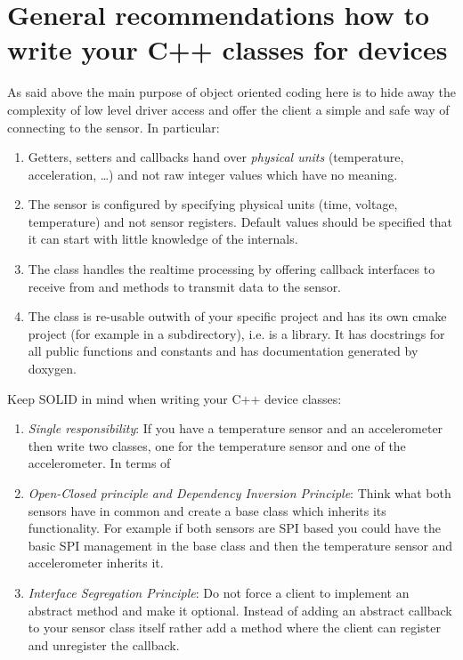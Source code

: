 \documentclass[12pt]{report}
\begin{document}
\section{General recommendations how to write your C++ classes for devices}
As said above the main purpose of object oriented coding here is to
hide away the complexity of low level driver access and offer the
client a simple and safe way of connecting to the sensor. In particular:
\begin{enumerate}
\item Getters, setters and callbacks hand over \textsl{physical units}
  (temperature, acceleration, \ldots) and not
  raw integer values which have no meaning.
\item The sensor is configured by specifying physical units (time, voltage,
  temperature) and not sensor registers. Default values should be
  specified that it can start with little knowledge of the internals.
\item The class handles the realtime processing by offering callback
  interfaces to receive from and methods to transmit data to the sensor.
\item The class is re-usable outwith of your specific project and has
  its own cmake project (for example in a subdirectory), i.e. is a
  library. It has docstrings for all public functions and constants
  and has documentation generated by doxygen.
\end{enumerate}

Keep SOLID in mind when writing your C++ device classes:
\begin{enumerate}
\item \textsl{Single responsibility}: If you have a temperature
sensor and an accelerometer then write two classes, one for the
temperature sensor and one of the accelerometer. In terms of
\item \textsl{Open-Closed principle and Dependency Inversion Principle}:
  Think what both sensors have
in common and create a base class which inherits its functionality.
For example if both sensors are SPI based you could have the basic
SPI management in the base class and then the temperature sensor
and accelerometer inherits it.
\item \textsl{Interface Segregation Principle}: Do not force
  a client to implement an abstract method and make it optional.
  Instead of adding an abstract callback to your sensor class itself
  rather add a method where the client can register and unregister
  the callback.
\end{enumerate}
\end{document}
